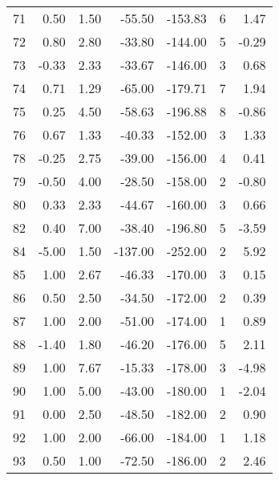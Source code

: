\begin{appendices}
\begin{longtable}[c]{@{}rrrrrrr@{}}
71 & 0.50 & 1.50 & -55.50 & -153.83 & 6 & 1.47 \\

72 & 0.80 & 2.80 & -33.80 & -144.00 & 5 & -0.29 \\

73 & -0.33 & 2.33 & -33.67 & -146.00 & 3 & 0.68 \\

74 & 0.71 & 1.29 & -65.00 & -179.71 & 7 & 1.94 \\

75 & 0.25 & 4.50 & -58.63 & -196.88 & 8 & -0.86 \\

76 & 0.67 & 1.33 & -40.33 & -152.00 & 3 & 1.33 \\

78 & -0.25 & 2.75 & -39.00 & -156.00 & 4 & 0.41 \\

79 & -0.50 & 4.00 & -28.50 & -158.00 & 2 & -0.80 \\

80 & 0.33 & 2.33 & -44.67 & -160.00 & 3 & 0.66 \\

82 & 0.40 & 7.00 & -38.40 & -196.80 & 5 & -3.59 \\

84 & -5.00 & 1.50 & -137.00 & -252.00 & 2 & 5.92 \\

85 & 1.00 & 2.67 & -46.33 & -170.00 & 3 & 0.15 \\

86 & 0.50 & 2.50 & -34.50 & -172.00 & 2 & 0.39 \\

87 & 1.00 & 2.00 & -51.00 & -174.00 & 1 & 0.89 \\

88 & -1.40 & 1.80 & -46.20 & -176.00 & 5 & 2.11 \\

89 & 1.00 & 7.67 & -15.33 & -178.00 & 3 & -4.98 \\

90 & 1.00 & 5.00 & -43.00 & -180.00 & 1 & -2.04 \\

91 & 0.00 & 2.50 & -48.50 & -182.00 & 2 & 0.90 \\

92 & 1.00 & 2.00 & -66.00 & -184.00 & 1 & 1.18 \\

93 & 0.50 & 1.00 & -72.50 & -186.00 & 2 & 2.46 \\


\end{longtable}
\end{appendices}
